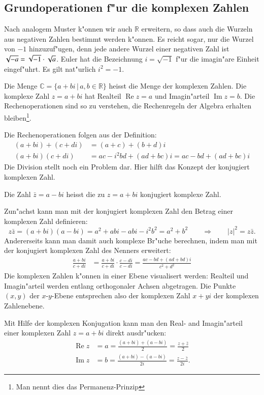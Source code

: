 \subsection{Grundoperationen f"ur die komplexen Zahlen}
Nach analogem Muster k"onnen wir auch $\mathbb R$ erweitern, so dass auch
die Wurzeln aus negativen Zahlen bestimmt werden k"onnen. Es reicht
sogar, nur die Wurzel von $-1$ hinzuzuf"ugen, denn jede andere Wurzel
einer negativen Zahl ist $\sqrt{-a}=\sqrt{-1}\cdot\sqrt{\mathstrut a}$.
Euler hat die Bezeichnung $i=\sqrt{-1}$ f"ur die imagin"are Einheit eingef"uhrt.
Es gilt nat"urlich $i^2=-1$.

\begin{definition}
Die Menge $\mathbb C=\{a+bi\,|\,a,b\in\mathbb R\}$ heisst die Menge der
komplexen Zahlen. Die komplexe Zahl $z=a+bi$ hat
Realteil $\operatorname{Re}z=a$ und Imagin"arteil $\operatorname{Im}z=b$.
Die Rechenoperationen sind so zu verstehen, die Rechenregeln
der Algebra erhalten bleiben\footnote{Man nennt dies das Permanenz-Prinzip}.
\end{definition}

Die Rechenoperationen folgen aus der Definition:
\begin{align*}
(a+bi)+(c+di)&=(a+c)+(b+d)i\\
(a+bi)(c+di)&=ac-i^2bd+(ad+bc)i=ac-bd+(ad+bc)i
\end{align*}
Die Division stellt noch ein Problem dar. Hier hilft das Konzept der
konjugiert komplexen Zahl.

\begin{definition}
Die Zahl $\bar z=a-bi$ heisst die zu $z=a+bi$ konjugiert komplexe Zahl.
\end{definition}

Zun"achst kann man mit der konjugiert komplexen Zahl den Betrag einer
komplexen Zahl definieren:
\[
z\bar z=(a+bi)(a-bi)=a^2+abi-abi-i^2b^2=a^2+b^2\qquad\Rightarrow\qquad
|z|^2=z\bar z.
\]
Andererseits kann man damit auch komplexe Br"uche berechnen, indem man
mit der konjugiert komplexen Zahl des Nenners erweitert:
\begin{align*}
\frac{a+bi}{c+di}&=
\frac{a+bi}{c+di}
\cdot
\frac{c-di}{c-di}=\frac{ac-bd+(ad+bd)i}{c^2+d^2}
\end{align*}
Die komplexen Zahlen k"onnen in einer Ebene visualisert werden: 
Realteil und Imagin"arteil werden entlang orthogonaler Achsen abgetragen.
Die Punkte $(x,y)$ der $x$-$y$-Ebene entsprechen also der komplexen Zahl
$x+yi$ der komplexen Zahlenebene.

Mit Hilfe der komplexen Konjugation kann man den Real- and Imagin"arteil
einer komplexen Zahl $z=a+bi$ direkt ausdr"ucken:
\begin{align}
\operatorname{Re}z 
&=
a=\frac{(a+bi)+(a-bi)}2=\frac{z+\bar z}2
\label{realteil-formel}
\\
\operatorname{Im}z
&=
b=\frac{(a+bi)-(a-bi)}{2i}=\frac{z-\bar z}{2i}.
\label{imaginaerteil-formel}
\end{align}

